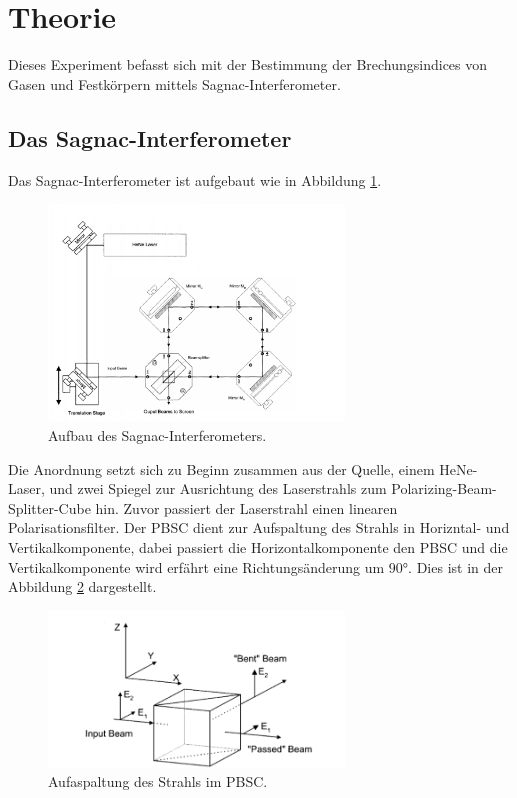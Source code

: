 \section{Theorie}
\label{sec:Theorie}
Dieses Experiment befasst sich mit der Bestimmung der Brechungsindices
von Gasen und Festkörpern mittels Sagnac-Interferometer.

\subsection{Das Sagnac-Interferometer}
Das Sagnac-Interferometer ist aufgebaut wie in Abbildung \ref{fig:apparat}.
\begin{figure}
    \centering
    \includegraphics[width=0.7\textwidth]{Apparatur.PNG}
    \caption{Aufbau des Sagnac-Interferometers.\cite{skript}}
    \label{fig:apparat}
\end{figure}
\FloatBarrier
Die Anordnung setzt sich zu Beginn zusammen aus der Quelle, einem HeNe-Laser, und zwei
Spiegel zur Ausrichtung des Laserstrahls zum Polarizing-Beam-Splitter-Cube hin.
Zuvor passiert der Laserstrahl einen linearen Polarisationsfilter.
Der PBSC dient zur Aufspaltung des Strahls in Horizntal- und Vertikalkomponente,
dabei passiert die Horizontalkomponente den PBSC und die Vertikalkomponente wird
erfährt eine Richtungsänderung um $90\si{\degree}$. Dies ist in der Abbildung
\ref{fig:pbsc} dargestellt.
\begin{figure}
   \centering
   \includegraphics[width=0.7\textwidth]{Pbsc.PNG}
   \caption{Aufaspaltung des Strahls im PBSC.\cite{skript}}
   \label{fig:pbsc}
\end{figure}

